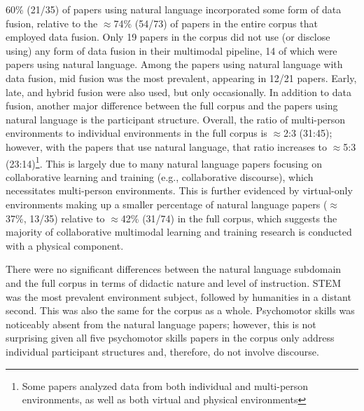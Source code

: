 \documentclass[manuscript,screen,review]{acmart}
\begin{document}
60\% (21/35) of papers using natural language incorporated some form of data fusion, relative to the $\approx$74\% (54/73) of papers in the entire corpus that employed data fusion. Only 19 papers in the corpus did not use (or disclose using) any form of data fusion in their multimodal pipeline, 14 of which were papers using natural language. Among the papers using natural language with data fusion, mid fusion was the most prevalent, appearing in 12/21 papers. Early, late, and hybrid fusion were also used, but only occasionally. In addition to data fusion, another major difference between the full corpus and the papers using natural language is the participant structure. Overall, the ratio of multi-person environments to individual environments in the full corpus is $\approx$2:3 (31:45); however, with the papers that use natural language, that ratio increases to $\approx$5:3 (23:14)\footnote{Some papers analyzed data from both individual and multi-person environments, as well as both virtual and physical environments}. This is largely due to many natural language papers focusing on collaborative learning and training (e.g., collaborative discourse), which necessitates multi-person environments. This is further evidenced by virtual-only environments making up a smaller percentage of natural language papers ($\approx$37\%, 13/35) relative to $\approx$42\% (31/74) in the full corpus, which suggests the majority of collaborative multimodal learning and training research is conducted with a physical component. 

There were no significant differences between the natural language subdomain and the full corpus in terms of didactic nature and level of instruction. STEM was the most prevalent environment subject, followed by humanities in a distant second. This was also the same for the corpus as a whole. Psychomotor skills was noticeably absent from the natural language papers; however, this is not surprising given all five psychomotor skills papers in the corpus only address individual participant structures and, therefore, do not involve discourse.
\end{document}
